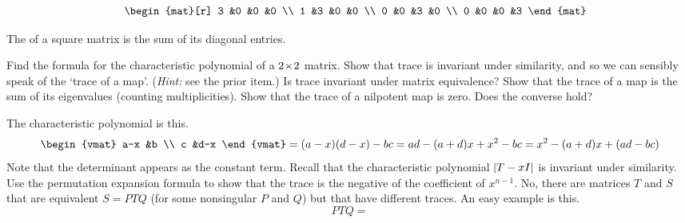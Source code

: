 \begin{exercises}
\begin{answer}
\begin{equation*}
          \quad
          \begin{mat}[r]
             3  &0  &0  &0  \\
             1  &3  &0  &0  \\
             0  &0  &3  &0  \\
             0  &0  &0  &3
          \end{mat}
       \end{equation*} 
     \end{answer}
  \item 
    The  
    of a square matrix is the sum of its diagonal entries.
    \begin{exparts}
       \partsitem Find the formula for the characteristic polynomial of
         a $2 \! \times \! 2$ matrix.
       \partsitem Show that 
         trace is invariant under similarity, and so we can sensibly
         speak of the `trace of a map'.
         (\textit{Hint:}  see the prior item.)
       \partsitem Is trace invariant under matrix equivalence?
       \partsitem Show that the trace of a map is the sum of its eigenvalues
         (counting multiplicities).
       \partsitem Show that the trace of a nilpotent map is zero.
         Does the converse hold?
    \end{exparts}
    \begin{answer}
      \begin{exparts}
         \partsitem The characteristic polynomial is this. 
           \begin{equation*}
             \begin{vmat}
               a-x  &b  \\
               c  &d-x
             \end{vmat}
             =(a-x)(d-x)-bc=ad-(a+d)x+x^2-bc
             =x^2-(a+d)x+(ad-bc)
           \end{equation*}
           Note that the determinant appears as the constant term.
         \partsitem Recall that the characteristic polynomial
            \( \deter{T-xI} \) is invariant under similarity.
            Use the permutation expansion formula to show that the trace
            is the negative of the coefficient of \( x^{n-1} \).
         \partsitem No, there are matrices $T$ and $S$ that are
            equivalent $S=PTQ$ (for some nonsingular $P$ and $Q$)
            but that have different traces.
            An easy example is this.
            \begin{equation*}
               PTQ=

\end{equation*}
\end{exparts}
\end{answer}
\end{exercises}
